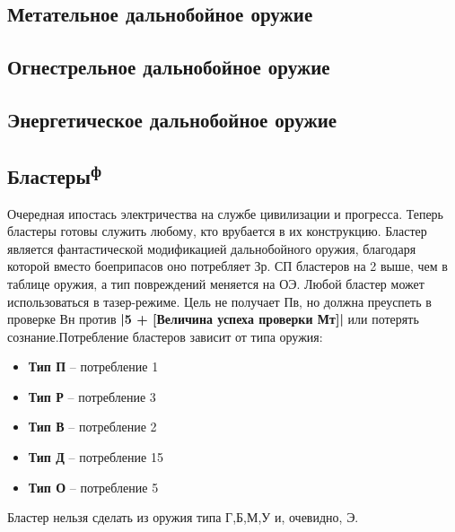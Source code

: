 
\newpage
\subsection{Метательное дальнобойное оружие}

\newpage
\subsection{Огнестрельное дальнобойное оружие}

\newpage
\subsection{Энергетическое дальнобойное оружие}

\newpage
\subsection{Бластеры\textsuperscript{ф}}
Очередная ипостась электричества на службе цивилизации и прогресса. Теперь бластеры готовы служить любому, кто врубается в их конструкцию.
\newline Бластер является фантастической модификацией дальнобойного оружия, благодаря которой вместо боеприпасов оно потребляет Зр. СП бластеров на 2 выше, чем в таблице оружия, а тип повреждений меняется на ОЭ.
\newline Любой бластер может использоваться в тазер-режиме. Цель не получает Пв, но должна преуспеть в проверке Вн против \textbf{|5 + [Величина успеха проверки Мт]|} или потерять сознание.\newline Потребление бластеров зависит от типа оружия:
\begin{itemize}
\item \textbf{Тип П} -- потребление 1
\item \textbf{Тип Р} -- потребление 3
\item \textbf{Тип В} -- потребление 2
\item \textbf{Тип Д} -- потребление 15
\item \textbf{Тип О} -- потребление 5
\end{itemize}
Бластер нельзя сделать из оружия типа Г,Б,М,У и, очевидно, Э.%

\printindex[weapons]



